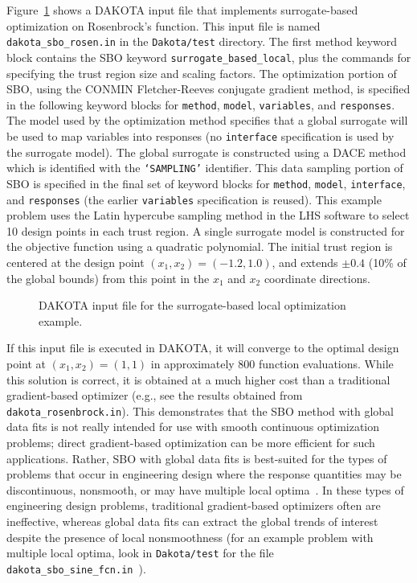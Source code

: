 Figure~\ref{sbm:sblm_rosen} shows a DAKOTA input file that implements
surrogate-based optimization on Rosenbrock's function. This input file
is named \texttt{dakota\_sbo\_rosen.in} in the \texttt{Dakota/test}
directory.  The first method keyword block contains the SBO 
keyword \texttt{surrogate\_based\_local}, plus the commands for
specifying the trust region size and scaling factors. The optimization
portion of SBO, using the CONMIN Fletcher-Reeves conjugate gradient method,
is specified in the following keyword blocks for
\texttt{method}, \texttt{model}, \texttt{variables}, and
\texttt{responses}.  The model used by the optimization method 
specifies that a global surrogate will be used to map variables into
responses (no \texttt{interface} specification is used by the
surrogate model). The global surrogate is constructed using a DACE
method which is identified with the \texttt{`SAMPLING'} identifier.
This data sampling portion of SBO is specified in the final set of
keyword blocks for \texttt{method}, \texttt{model},
\texttt{interface}, and \texttt{responses} (the earlier 
\texttt{variables} specification is reused). This example problem uses 
the Latin hypercube sampling method in the LHS software to select 10
design points in each trust region. A single surrogate model is
constructed for the objective function using a quadratic polynomial.
The initial trust region is centered at the design point
$(x_1,x_2)=(-1.2,1.0)$, and extends $\pm 0.4$ (10\% of the global
bounds) from this point in the $x_1$ and $x_2$ coordinate directions.
\begin{figure}
  \begin{bigbox}
    \begin{tiny}
    \end{tiny}
  \end{bigbox}
  \caption{DAKOTA input file for the surrogate-based local optimization
    example.}
  \label{sbm:sblm_rosen}
\end{figure}

If this input file is executed in DAKOTA, it will converge to the
optimal design point at $(x_{1},x_{2})=(1,1)$ in approximately 800
function evaluations. While this solution is correct, it is obtained
at a much higher cost than a traditional gradient-based optimizer
(e.g., see the results obtained from \texttt{dakota\_rosenbrock.in}).
This demonstrates that the SBO method with global data fits is not
really intended for use with smooth continuous optimization problems;
direct gradient-based optimization can be more efficient for such
applications. Rather, SBO with global data fits is best-suited for the
types of problems that occur in engineering design where the response
quantities may be discontinuous, nonsmooth, or may have multiple local
optima~\cite{Giu02}. In these types of engineering design problems,
traditional gradient-based optimizers often are ineffective, whereas
global data fits can extract the global trends of interest despite the
presence of local nonsmoothness (for an example problem with multiple
local optima, look in \texttt{Dakota/test} for the file
\texttt{dakota\_sbo\_sine\_fcn.in}~\cite{Giu00}).

